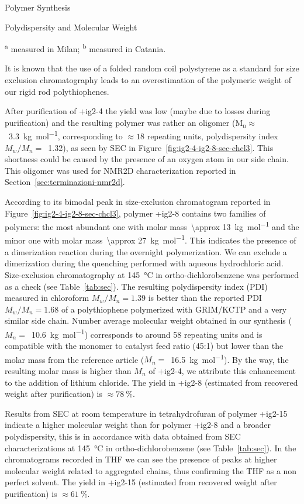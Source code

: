 \begin{section}{Polymer Synthesis}
\begin{subsection}{Polydispersity and Molecular Weight}
{\begin{table}[tbhp]
{\textsuperscript{a} measured in Milan; \textsuperscript{b} measured in Catania.}
\end{table}
}

It is known that the use of a folded random coil polystyrene as a standard for size exclusion chromatography leads to an overestimation of the polymeric weight of our rigid rod poly\-thio\-phenes. 

After purification of \cmpd+{ig2-4} the yield was low (maybe due to losses during purification) and the resulting polymer was rather an oligomer ($\mathrm{M_n}\approx$~\SI{3.3}{\kg\per\mole}, corresponding to $\approx18$ repeating units, polydispersity index $M_w/M_n=$~1.32), as seen by \gls{SEC} in Figure~\ref{fig:ig2-4-ig2-8-sec-chcl3}. This shortness could be caused by the presence of an oxy\-gen atom in our side chain. This oligomer was used for \gls{NMR2D} characterization reported in Section~\ref{sec:terminazioni-nmr2d}.

According to its bi\-modal peak in size-exclusion chromatogram reported in Figure~\ref{fig:ig2-4-ig2-8-sec-chcl3}, polymer \cmpd+{ig2-8} contains two families of polymers: the most abundant one with molar mass~\SI{\approx 13}{\kg\per\mole} and the minor one with molar mass~\SI{\approx 27}{\kg\per\mole}. This indicates the presence of a dimerization reaction during the overnight polymerization. 
We can exclude a dimerization during the quenching performed with aqueous hydrochloric acid. Size-exclusion chromatography at \SI{145}{\celsius} in ortho-di\-chloro\-benzene was performed as a check (see Table~\ref{tab:sec}). The resulting polydispersity index (\acrshort{PDI}) measured in chloroform $M_w/M_n = 1.39$ is better than the reported \gls{PDI} $M_w/M_n=1.68$ of a poly\-thio\-phene polymerized with \gls{GRIM}\-/\gls{KCTP} and a very similar side chain.
Number average molecular weight obtained in our synthesis ($M_n =$~\SI{10.6}{\kg\per\mole}) corresponds to around 58 repeating units and is compatible with the monomer to catalyst feed ratio (45:1) but lower than the molar mass from the reference article ($M_n =$~\SI{16.5}{\kg\per\mole}). 
By the way, the resulting molar mass is higher than $M_n$ of \cmpd+{ig2-4}, we attribute this enhancement to the addition of lithium chloride. The yield in \cmpd+{ig2-8} (estimated from recovered weight after purification) is $\approx 78~\%$. 

Results from \gls{SEC} at room temperature in tetrahydrofuran of polymer \cmpd+{ig2-15} indicate a higher molecular weight than for polymer \cmpd+{ig2-8} and a broader polydispersity, this is in accordance with data obtained from \gls{SEC} characterizations at \SI{145}{\celsius} in ortho-di\-chloro\-benzene (see Table~\ref{tab:sec}). In the chromatograms recorded in \gls{THF} we can see the presence of peaks at higher molecular weight related to aggregated chains, thus confirming the \gls{THF} as a non perfect solvent. 
The yield in \cmpd+{ig2-15} (estimated from recovered weight after purification) is $\approx 61~\%$.


\end{subsection}
\end{section}
